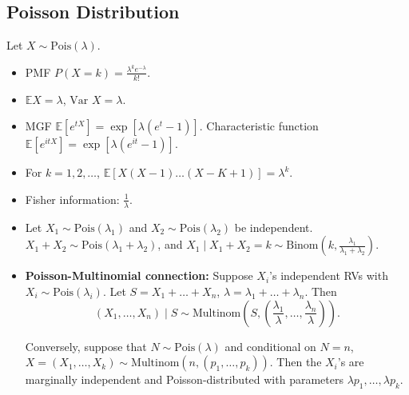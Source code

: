 \documentclass[twoside]{article}
\newcommand\bbE{\mathbb{E}}
\newcommand\lmb{\lambda}
\newcommand\var{\text{Var }}
\begin{document}
\subsection{Poisson Distribution}
Let $X \sim \text{Pois}(\lmb)$.
\begin{itemize}
\item PMF $P(X = k) = \displaystyle\frac{\lmb^k e^{-\lmb}}{k!}$.

\item $\bbE X = \lmb$, $\var X = \lmb$.

\item MGF $\bbE [e^{tX}] = \exp \left[ \lmb(e^t - 1) \right]$. Characteristic function $\bbE [e^{itX}] = \exp \left[ \lmb (e^{it} - 1) \right]$.

\item For $k = 1,2, \dots$, $\bbE [X(X-1)\dots (X - K + 1)] = \lmb^k$.

\item Fisher information: $\displaystyle\frac{1}{\lmb}$.

\item Let $X_1 \sim \text{Pois}(\lmb_1)$ and $X_2 \sim \text{Pois}(\lmb_2)$ be independent. $X_1 + X_2 \sim \text{Pois}(\lmb_1 + \lmb_2)$, and $X_1 \mid X_1 + X_2 = k \sim \text{Binom}\left(k, \displaystyle\frac{\lmb_1}{\lmb_1 + \lmb_2} \right)$.

\item \textbf{Poisson-Multinomial connection:} Suppose $X_i$'s independent RVs with $X_i \sim \text{Pois}(\lmb_i)$. Let $S = X_1 + \dots + X_n$, $\lmb = \lmb_1 + \dots + \lmb_n$. Then
\begin{equation*}
(X_1, \dots, X_n) \mid S \sim \text{Multinom}\left( S, \left( \frac{\lmb_1}{\lmb}, \dots, \frac{\lmb_n}{\lmb} \right) \right).
\end{equation*}

Conversely, suppose that $N \sim \text{Pois}(\lmb)$ and conditional on $N = n$, $X = (X_1, \dots, X_k) \sim \text{Multinom}(n, (p_1, \dots, p_k))$. Then the $X_i$'s are marginally independent and Poisson-distributed with parameters $\lmb p_1, \dots, \lmb p_k$.

\end{itemize}

\end{document}
